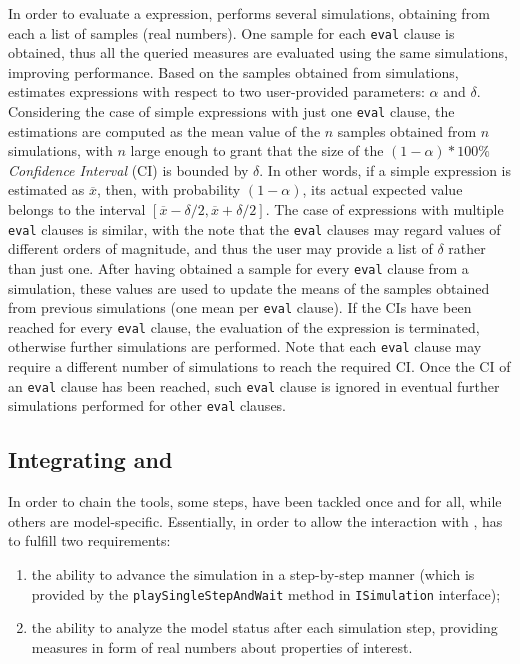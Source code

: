\documentclass[12pt,a4paper,twoside,openright]{book}
\begin{document}
In order to evaluate a \multiquatex{} expression, \multivesta{} performs several simulations, obtaining from each a list of samples (real numbers).
%
One sample for each \texttt{eval} clause is obtained, thus all the queried measures are evaluated using the same simulations, improving performance.
%
Based on the samples obtained from simulations, \multivesta{} estimates \multiquatex{} expressions with respect to two user-provided parameters: $\alpha$ and $\delta$. 
%
Considering the case of simple expressions with just one \texttt{eval} clause, the estimations are computed as the mean value of the $n$ samples obtained from $n$ simulations, with $n$ large enough to grant that the size of the $(1 - \alpha)*100\%$  \textit{Confidence Interval} (CI) is bounded by $\delta$.
%
In other words, if a simple \multiquatex{} expression is estimated as $\overline{x}$, then, with probability $(1 - \alpha)$, its actual expected value belongs to the interval $[\overline{x} - \delta/2,\overline{x} + \delta/2]$.
%
The case of expressions with multiple \texttt{eval} clauses is similar, with the note that the \texttt{eval} clauses may regard values of different orders of magnitude, and thus the user may provide a list of $\delta$ rather than just one. 
%
After having obtained a sample for every \texttt{eval} clause from a simulation, these values are used to update the means of the samples obtained from previous simulations (one mean per \texttt{eval} clause). If the CIs have been reached for every \texttt{eval} clause, the evaluation of the expression is terminated, otherwise further simulations are performed.
%
Note that each \texttt{eval} clause may require a different number of simulations to reach the required CI. Once the CI of an \texttt{eval} clause has been reached, such \texttt{eval} clause is ignored in eventual further simulations performed for other \texttt{eval} clauses. 


\subsection{Integrating \multivesta{} and \alchemist{}}

In order to chain the tools, some steps, have been tackled once and for all, while others are model-specific.
%
Essentially, in order to allow the interaction with \multivesta{}, \alchemist{} has to fulfill two requirements:
\begin{enumerate}
 \item the ability to advance the simulation in a step-by-step manner (which is provided by the \texttt{playSingleStepAndWait} method in \texttt{ISimulation} interface);
 \item the ability to analyze the model status after each simulation step, providing measures in form of real numbers about properties of interest.
\end{enumerate}
\end{document}

